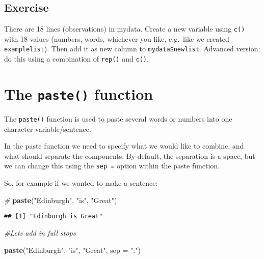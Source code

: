 \documentclass[]{book}
\makeatletter
\newenvironment{Shaded}{\begin{snugshade}}{\end{snugshade}}
\newcommand{\KeywordTok}[1]{\textcolor[rgb]{0.13,0.29,0.53}{\textbf{#1}}}
\newcommand{\DataTypeTok}[1]{\textcolor[rgb]{0.13,0.29,0.53}{#1}}
\newcommand{\StringTok}[1]{\textcolor[rgb]{0.31,0.60,0.02}{#1}}
\newcommand{\CommentTok}[1]{\textcolor[rgb]{0.56,0.35,0.01}{\textit{#1}}}
\newcommand{\NormalTok}[1]{#1}
\newenvironment{kframe}{%
\medskip{}
\setlength{\fboxsep}{.8em}
 \def\at@end@of@kframe{}%
 \ifinner\ifhmode%
  \def\at@end@of@kframe{\end{minipage}}%
  \begin{minipage}{\columnwidth}%
 \fi\fi%
 \def\FrameCommand##1{\hskip\@totalleftmargin \hskip-\fboxsep
 \colorbox{shadecolor}{##1}\hskip-\fboxsep
     \hskip-\linewidth \hskip-\@totalleftmargin \hskip\columnwidth}%
 \MakeFramed {\advance\hsize-\width
   \@totalleftmargin\z@ \linewidth\hsize
   \@setminipage}}%
 {\par\unskip\endMakeFramed%
 \at@end@of@kframe}
\renewenvironment{Shaded}{\begin{kframe}}{\end{kframe}}
\theoremstyle{definition}
\theoremstyle{definition}
\theoremstyle{definition}
\theoremstyle{remark}
\makeatother
\begin{document}
\subsection{Exercise}\label{exercise-11}

There are 18 lines (observations) in mydata. Create a new variable using
\texttt{c()} with 18 values (numbers, words, whichever you like,
e.g.~like we created \texttt{examplelist}). Then add it as new column to
\texttt{mydata\$newlist}. Advanced version: do this using a combination
of \texttt{rep()} and \texttt{c()}.

\newpage

\section{\texorpdfstring{The \texttt{paste()}
function}{The paste() function}}\label{the-paste-function}

The \texttt{paste()} function is used to paste several words or numbers
into one character variable/sentence.

In the paste function we need to specify what we would like to combine,
and what should separate the components. By default, the separation is a
space, but we can change this using the \texttt{sep\ =} option within
the paste function.

So, for example if we wanted to make a sentence:

\begin{Shaded}
\begin{Highlighting}[]
\CommentTok{# }
\KeywordTok{paste}\NormalTok{(}\StringTok{"Edinburgh"}\NormalTok{, }\StringTok{"is"}\NormalTok{, }\StringTok{"Great"}\NormalTok{)}
\end{Highlighting}
\end{Shaded}

\begin{verbatim}
## [1] "Edinburgh is Great"
\end{verbatim}

\begin{Shaded}
\begin{Highlighting}[]
\CommentTok{#Lets add in full stops}

\KeywordTok{paste}\NormalTok{(}\StringTok{"Edinburgh"}\NormalTok{, }\StringTok{"is"}\NormalTok{, }\StringTok{"Great"}\NormalTok{, }\DataTypeTok{sep =} \StringTok{"."}\NormalTok{)}
\end{Highlighting}
\end{Shaded}
\end{document}

